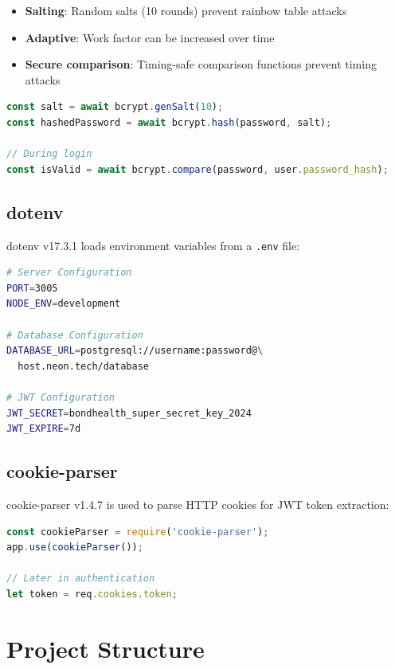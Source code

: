 \begin{itemize}
    \item \textbf{Salting}: Random salts (10 rounds) prevent rainbow table attacks
    \item \textbf{Adaptive}: Work factor can be increased over time
    \item \textbf{Secure comparison}: Timing-safe comparison functions prevent timing attacks
\end{itemize}

\begin{lstlisting}[language=JavaScript, caption=Password Hashing in Registration, basicstyle=\ttfamily\small, breaklines=true]
const salt = await bcrypt.genSalt(10);
const hashedPassword = await bcrypt.hash(password, salt);

// During login
const isValid = await bcrypt.compare(password, user.password_hash);
\end{lstlisting}

\subsection{dotenv}
dotenv v17.3.1 loads environment variables from a \texttt{.env} file:

\begin{lstlisting}[language=bash, caption=Environment Variables, basicstyle=\ttfamily\small, breaklines=true]
# Server Configuration
PORT=3005
NODE_ENV=development

# Database Configuration
DATABASE_URL=postgresql://username:password@\
  host.neon.tech/database

# JWT Configuration
JWT_SECRET=bondhealth_super_secret_key_2024
JWT_EXPIRE=7d
\end{lstlisting}

\subsection{cookie-parser}
cookie-parser v1.4.7 is used to parse HTTP cookies for JWT token extraction:

\begin{lstlisting}[language=JavaScript, caption=Cookie Parser Usage, basicstyle=\ttfamily\small, breaklines=true]
const cookieParser = require('cookie-parser');
app.use(cookieParser());

// Later in authentication
let token = req.cookies.token;
\end{lstlisting}

\section{Project Structure}

